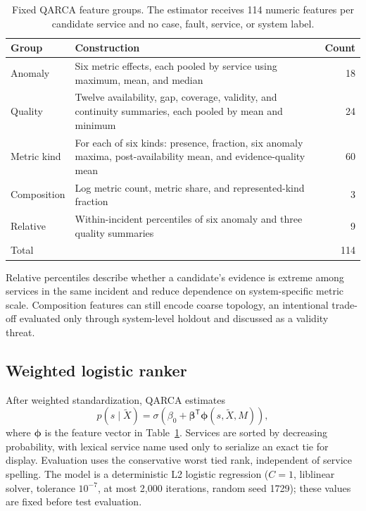 \documentclass[runningheads]{llncs}
\begin{document}
\begin{table}[t]
\caption{Fixed QARCA feature groups. The estimator receives 114 numeric
features per candidate service and no case, fault, service, or system label.}
\label{tab:features}
\centering
\small
\begin{tabular}{p{2.8cm}p{7.9cm}r}
\toprule
Group & Construction & Count\\
\midrule
Anomaly & Six metric effects, each pooled by service using maximum, mean,
and median & 18\\
Quality & Twelve availability, gap, coverage, validity, and continuity
summaries, each pooled by mean and minimum & 24\\
Metric kind & For each of six kinds: presence, fraction, six anomaly maxima,
post-availability mean, and evidence-quality mean & 60\\
Composition & Log metric count, metric share, and represented-kind fraction & 3\\
Relative & Within-incident percentiles of six anomaly and three quality
summaries & 9\\
\midrule
Total & & 114\\
\bottomrule
\end{tabular}
\end{table}

Relative percentiles describe whether a candidate's evidence is extreme among
services in the same incident and reduce dependence on system-specific metric
scale. Composition features can still encode coarse topology, an intentional
trade-off evaluated only through system-level holdout and discussed as a
validity threat.

\subsection{Weighted logistic ranker}

After weighted standardization, QARCA estimates
\begin{equation}
  p(s\mid\widetilde{X})=
  \sigma\!\left(\beta_0+\boldsymbol{\beta}^{\mathsf T}
  \boldsymbol{\phi}(s,\widetilde{X},M)\right),
\end{equation}
where $\boldsymbol{\phi}$ is the feature vector in
Table~\ref{tab:features}. Services are sorted by decreasing probability, with
lexical service name used only to serialize an exact tie for display. Evaluation
uses the conservative worst tied rank, independent of service spelling. The model is a
deterministic L2 logistic regression ($C=1$, liblinear solver, tolerance
$10^{-7}$, at most 2,000 iterations, random seed 1729); these values are fixed
before test evaluation.
\end{document}
